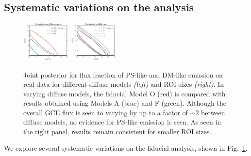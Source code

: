 \documentclass[prd,aps,10pt,nofootinbib,twocolumn,superscriptaddress,preprintnumbers,balancelastpage,longbibliography]{revtex4-1}
\begin{document}
\subsection{Systematic variations on the analysis}
\label{sec:systematics}

%
\begin{figure}
    \centering
    \includegraphics[width=0.22\textwidth]{plots/dif_var.pdf}
    \includegraphics[width=0.22\textwidth]{plots/roi_var.pdf}
    \caption{Joint posterior for flux fraction of PS-like and DM-like emission on real \Fermi data for different diffuse models \emph{(left)} and ROI sizes \emph{(right)}. In varying diffuse models, the fiducial Model O (red) is compared with results obtained using Models A (blue) and F (green). Although the overall GCE flux is seen to varying by up to a factor of $\sim2$ between diffuse models, no evidence for PS-like emission is seen. As seen in the right panel, results remain consistent for smaller ROI sizes.}
    \label{fig:variations}
\end{figure}
%

We explore several systematic variations on the fiducial analysis, shown in Fig.~\ref{fig:variations}.
\end{document}
